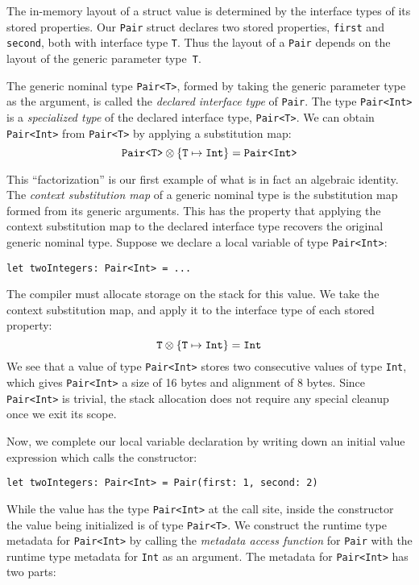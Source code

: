 \documentclass[../generics]{subfiles}
\begin{document}
The in-memory layout of a struct value is determined by the interface types of its stored properties. Our \texttt{Pair} struct declares two stored properties, \texttt{first} and \texttt{second}, both with interface type \texttt{T}. Thus the layout of a \texttt{Pair} depends on the layout of the generic parameter type~\texttt{T}.

The generic nominal type \texttt{Pair<T>}, formed by taking the generic parameter type as the argument, is called the \emph{declared interface type} of \texttt{Pair}. The type \texttt{Pair<Int>} is a \emph{specialized type} of the declared interface type, \texttt{Pair<T>}. We can obtain \texttt{Pair<Int>} from \texttt{Pair<T>} by applying a substitution map:
\[\texttt{Pair<T>} \otimes \{\texttt{T} \mapsto \texttt{Int}\} = \texttt{Pair<Int>}\]

This ``factorization'' is our first example of what is in fact an algebraic identity. The \emph{context substitution map} of a generic nominal type is the substitution map formed from its generic arguments. This has the property that applying the context substitution map to the declared interface type recovers the original generic nominal type. Suppose we declare a local variable of type \texttt{Pair<Int>}:
\begin{Verbatim}
let twoIntegers: Pair<Int> = ...
\end{Verbatim}
The compiler must allocate storage on the stack for this value. We take the context substitution map, and apply it to the interface type of each stored property:
\[\texttt{T} \otimes \{\texttt{T} \mapsto \texttt{Int}\} = \texttt{Int}\]
We see that a value of type \texttt{Pair<Int>} stores two consecutive values of type \texttt{Int}, which gives \texttt{Pair<Int>} a size of 16 bytes and alignment of 8 bytes. Since \texttt{Pair<Int>} is trivial, the stack allocation does not require any special cleanup once we exit its scope.

Now, we complete our local variable declaration by writing down an initial value expression which calls the constructor:
\begin{Verbatim}
let twoIntegers: Pair<Int> = Pair(first: 1, second: 2)
\end{Verbatim}
While the value has the type \texttt{Pair<Int>} at the call site, inside the constructor the value being initialized is of type \texttt{Pair<T>}. We construct the runtime type metadata for \texttt{Pair<Int>} by calling the \emph{metadata access function} for \texttt{Pair} with the runtime type metadata for \texttt{Int} as an argument. The metadata for \texttt{Pair<Int>} has two parts:
\end{document}
